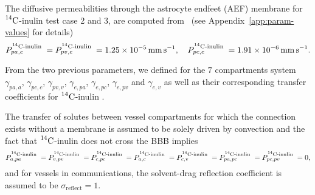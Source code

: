 \documentclass[10pt]{article}
\newcommand{\1}{^{(1)}}
\newcommand{\2}{^{(2)}}
\newcommand{\Cinulin}{$\prescript{14}{}{\text{C}}$-inulin }
\begin{document}
The diffusive permeabilities through the astrocyte endfeet (AEF) membrane for \Cinulin test case 2 and 3, are computed from~\cite{Li-2010-model, Michel-1999-permeablity} (see Appendix~\ref{app:param-values} for details)
\[
    P^{\text{\Cinulin}}_{pa,e} =  P^{\text{\Cinulin}}_{pv,e} =  1.25\times 10^{-5}\, \si{mm.s^{-1}},\quad P^{\text{\Cinulin}}_{pc,e} = 1.91\times 10^{-6} \, \si{mm.s^{-1}}.
\]

From the two previous parameters, we defined for the $7$ compartments system $\gamma_{pa , a}$, $\gamma_{pc , c}$, $\gamma_{pv , v}$, $\gamma_{e , pa}$, $\gamma_{e , pc}$, $\gamma_{e , pv}$ and $\gamma_{e, v}$ as well as their corresponding transfer coefficients for \Cinulin.

The transfer of solutes between vessel compartments for which the connection exists without a membrane is assumed to be solely driven by convection and the fact that \Cinulin does not cross the BBB implies
\[
    P_{a,pa}^\text{\Cinulin} = P_{v,pv}^\text{\Cinulin} = P_{c,pc}^\text{\Cinulin}= P_{a,c}^\text{\Cinulin}=P_{c,v}^\text{\Cinulin}=P_{pa, pc}^\text{\Cinulin} = P_{pc, pv}^\text{\Cinulin} = 0, 
\]
and for vessels in communications, the solvent-drag reflection coefficient is assumed to be $\sigma_\text{reflect}=1$.
\end{document}
